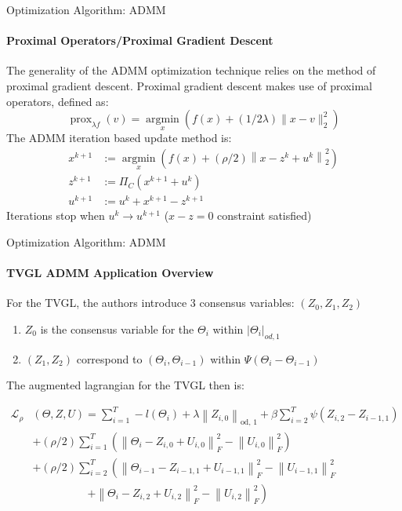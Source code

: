 \documentclass{beamer}
\begin{document}
\begin{frame}{Optimization Algorithm: ADMM}
\framesubtitle{Proximal Operators/Proximal Gradient Descent}
The generality of the ADMM optimization technique relies on the method of proximal gradient descent. Proximal gradient descent makes use of proximal operators, defined as:
\[\operatorname{prox}_{\lambda f}(v)=\underset{x}{\operatorname{argmin}}\left(f(x)+(1 / 2 \lambda)\|x-v\|_{2}^{2}\right)\]
The ADMM iteration based update method is:
\begin{align} 
\nonumber x^{k+1} &:=\underset{x}{\operatorname{argmin}}\left(f(x)+(\rho / 2)\left\|x-z^{k}+u^{k}\right\|_{2}^{2}\right) 
\\ \nonumber z^{k+1} &:=\Pi_{C}\left(x^{k+1}+u^{k}\right) 
\\ \nonumber u^{k+1} &:=u^{k}+x^{k+1}-z^{k+1} 
\end{align}
Iterations stop when $u^{k} \xrightarrow{} u^{k+1}$ ($x-z = 0$ constraint satisfied)
\end{frame}

\begin{frame}{Optimization Algorithm: ADMM}
\framesubtitle{TVGL ADMM Application Overview}

For the TVGL, the authors introduce 3 consensus variables: $(Z_{0}, Z_{1}, Z_{2})$

\begin{enumerate}
	\item $Z_{0}$ is the consensus variable for the $\Theta_{i}$ within $|\Theta_{i}|_{od, 1}$
	\item $(Z_{1}, Z_{2})$ correspond to $(\Theta_{i}, \Theta_{i-1})$ within $\Psi(\Theta_{i} - \Theta_{i-1})$
\end{enumerate}
	
The augmented lagrangian for the TVGL then is:

\begin{align}
\nonumber \mathcal{L}_{\rho}&(\Theta, Z, U) =\sum_{i=1}^{T}-l\left(\Theta_{i}\right)+\lambda\left\|Z_{i, 0}\right\|_{\text {od, } 1}+\beta \sum_{i=2}^{T} \psi\left(Z_{i, 2}-Z_{i-1,1}\right)
\nonumber \\ &+(\rho / 2) \sum_{i=1}^{T}\left(\left\|\Theta_{i}-Z_{i, 0}+U_{i, 0}\right\|_{F}^{2}-\left\|U_{i, 0}\right\|_{F}^{2}\right)
\nonumber \\ &+(\rho / 2) \sum_{i=2}^{T}\left(\left\|\Theta_{i-1}-Z_{i-1,1}+U_{i-1,1}\right\|_{F}^{2}-\left\|U_{i-1,1}\right\|_{F}^{2}\right.
\nonumber \\ & \quad \quad \quad \quad \quad \left.+\left\|\Theta_{i}-Z_{i, 2}+U_{i, 2}\right\|_{F}^{2}-\left\|U_{i, 2}\right\|_{F}^{2}\right) \nonumber
\end{align}

\end{frame}
\end{document}
